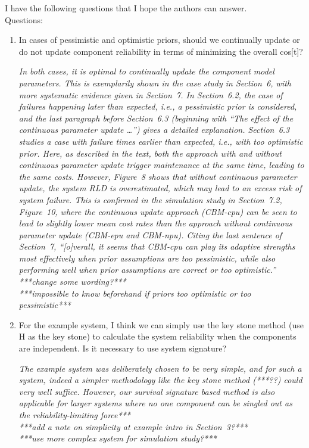 \documentclass[authoryear]{elsarticle}
\begin{document}
I have the following questions that I hope the authors can answer.\\
Questions:
\begin{enumerate}
\item In cases of pessimistic and optimistic priors, should we continually update or do not update component reliability in terms of minimizing the overall cos[t]?

\smallskip

\emph{In both cases, it is optimal to continually update the component model parameters.
This is exemplarily shown in the case study in Section~6, with more systematic evidence given in Section~7.
In Section~6.2, the case of failures happening later than expected, i.e., a pessimistic prior is considered,
and the last paragraph before Section~6.3 (beginning with ``The effect of the continuous parameter update \ldots'')
gives a detailed explanation.
Section~6.3 studies a case with failure times earlier than expected, i.e., with too optimistic prior.
Here, as described in the text, both the approach with and without continuous parameter update
trigger maintenance at the same time, leading to the same costs.
However, Figure~8 shows that without continuous parameter update, the system RLD is overestimated,
which may lead to an excess risk of system failure.
This is confirmed in the simulation study in Section~7.2, Figure~10,
where the continuous update approach (CBM-cpu) can be seen to lead to slightly lower mean cost rates
than the approach without continuous parameter update (CBM-epu and CBM-npu).
Citing the last sentence of Section~7,
``[o]verall, it seems that CBM-cpu can play its adaptive strengths most effectively
when prior assumptions are too pessimistic,
while also performing well when prior assumptions are correct or too optimistic.''\\
***change some wording?***\\
***impossible to know beforehand if priors too optimistic or too pessimistic***}
%
\item For the example system, I think we can simply use the key stone method (use H as the key stone) to calculate the system reliability when the components are independent.  Is it necessary to use system signature? 

\smallskip

\emph{The example system was deliberately chosen to be very simple,
and for such a system, indeed a simpler methodology like the key stone method (***??) could very well suffice.
However, our survival signature based method is also applicable for larger systems where no one component
can be singled out as the reliability-limiting force***\\
***add a note on simplicity at example intro in Section~3?***\\
***use more complex system for simulation study?***}
\end{enumerate}
\end{document}
